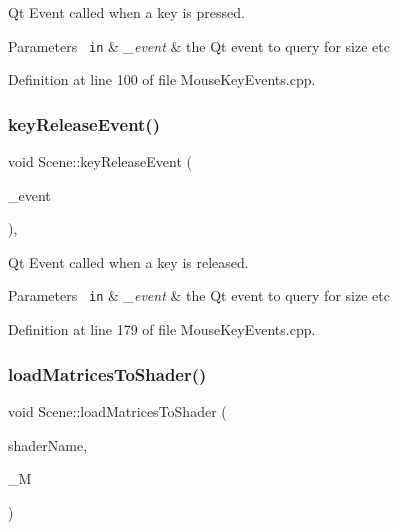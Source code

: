 Qt Event called when a key is pressed. 


\begin{DoxyParams}[1]{Parameters}
\mbox{\texttt{ in}}  & {\em \+\_\+event} & the Qt event to query for size etc \\
\hline
\end{DoxyParams}


Definition at line 100 of file Mouse\+Key\+Events.\+cpp.

\mbox{\label{class_scene_a38c25ace44976c7c4f107eedab295620}} 
\subsubsection{keyReleaseEvent()}
{\footnotesize\ttfamily void Scene\+::key\+Release\+Event (\begin{DoxyParamCaption}\item[{Q\+Key\+Event $\ast$}]{\+\_\+event }\end{DoxyParamCaption})\hspace{0.3cm}{\ttfamily [override]}, {\ttfamily [private]}}



Qt Event called when a key is released. 


\begin{DoxyParams}[1]{Parameters}
\mbox{\texttt{ in}}  & {\em \+\_\+event} & the Qt event to query for size etc \\
\hline
\end{DoxyParams}


Definition at line 179 of file Mouse\+Key\+Events.\+cpp.

\mbox{\label{class_scene_a9c8fdf926d7c46139162845d535115aa}} 
\subsubsection{loadMatricesToShader()}
{\footnotesize\ttfamily void Scene\+::load\+Matrices\+To\+Shader (\begin{DoxyParamCaption}\item[{const char $\ast$}]{shader\+Name,  }\item[{ngl\+::\+Mat4}]{\+\_\+M }\end{DoxyParamCaption})\hspace{0.3cm}{\ttfamily [private]}}



